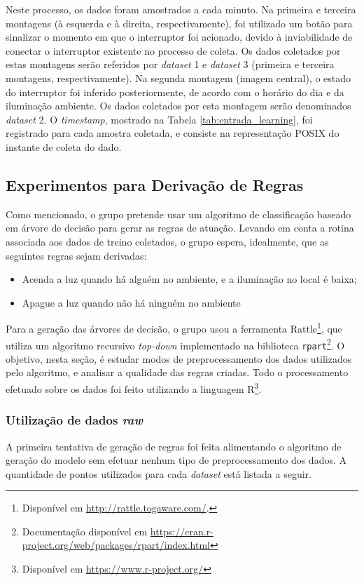 Neste processo, os dados foram amostrados a cada minuto. Na primeira e terceira montagens (à esquerda e à direita, respectivamente), foi utilizado um botão para sinalizar o momento em que o interruptor foi acionado, devido à inviabilidade de conectar o interruptor existente no processo de coleta. Os dados coletados por estas montagens serão referidos por \textit{dataset} 1 e \textit{dataset} 3 (primeira e terceira montagens, respectivamente). Na segunda montagem (imagem central), o estado do interruptor foi inferido posteriormente, de acordo com o horário do dia e da iluminação ambiente. Os dados coletados por esta montagem serão denominados \textit{dataset} 2. O \textit{timestamp}, mostrado na Tabela \ref{tab:entrada_learning}, foi registrado para cada amostra coletada, e consiste na representação POSIX do instante de coleta do dado.

\subsection{Experimentos para Derivação de Regras} \label{subsubsec:exp_regras}
Como mencionado, o grupo pretende usar um algoritmo de classificação baseado em árvore de decisão para gerar as regras de atuação. Levando em conta a rotina associada aos dados de treino coletados, o grupo espera, idealmente, que as seguintes regras sejam derivadas:
\begin{itemize}
	\item Acenda a luz quando há alguém no ambiente, e a iluminação no local é baixa;
	\item Apague a luz quando não há ninguém no ambiente
\end{itemize}

Para a geração das árvores de decisão, o grupo usou a ferramenta Rattle\footnote{Disponível em \url{http://rattle.togaware.com/}.}, que utiliza um algoritmo recursivo \textit{top-down} \cite{williams2011} implementado na biblioteca \texttt{rpart}\footnote{Documentação disponível em \url{https://cran.r-project.org/web/packages/rpart/index.html}}. O objetivo, nesta seção, é estudar modos de preprocessamento dos dados utilizados pelo algoritmo, e analisar a qualidade das regras criadas. Todo o processamento efetuado sobre os dados foi feito utilizando a linguagem R\footnote{Disponível em \url{https://www.r-project.org/}}.

\subsubsection{Utilização de dados \textit{raw}}
A primeira tentativa de geração de regras foi feita alimentando o algoritmo de geração do modelo sem efetuar nenhum tipo de preprocessamento dos dados. A quantidade de pontos utilizados para cada \textit{dataset} está listada a seguir.

